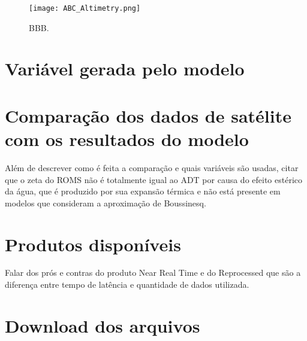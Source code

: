 \documentclass[12pt]{article}
\begin{document}
	\begin{figure}[h]
		\centering
		\texttt{[image: ABC\_Altimetry.png]}
   		\caption{BBB.
    	\label{fig:variaveis_altimetria}}
	\end{figure}

\section{Variável gerada pelo modelo}

\section{Comparação dos dados de satélite com os resultados do modelo}
	\par Além de descrever como é feita a comparação e quais variáveis são usadas, citar que o zeta do ROMS não é totalmente igual ao ADT por causa do efeito estérico da água, que é produzido por sua expansão térmica e não está presente em modelos que consideram a aproximação de Boussinesq.

\section{Produtos disponíveis}
	\par Falar dos prós e contras do produto Near Real Time e do Reprocessed que são a diferença entre tempo de latência e quantidade de dados utilizada.

\section{Download dos arquivos}
	


\end{document}

